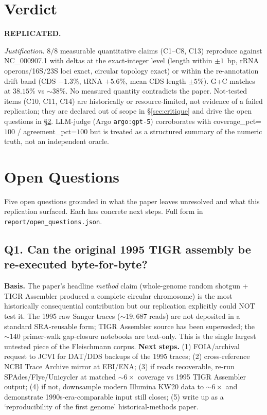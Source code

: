 \documentclass[10pt]{article}
\begin{document}
\section{Verdict}
\label{sec:verdict}

\textbf{REPLICATED.}

\noindent\emph{Justification.} $8/8$ measurable quantitative claims (C1--C8, C13) reproduce
against NC\_000907.1 with deltas at the exact-integer level (length within $\pm 1$~bp, rRNA
operons/16S/23S loci exact, circular topology exact) or within the re-annotation drift band
(CDS $-1.3\%$, tRNA $+5.6\%$, mean CDS length $\pm 5\%$). G+C matches at $38.15\%$ vs
$\sim 38\%$. No measured quantity contradicts the paper. Not-tested items (C10, C11, C14)
are historically or resource-limited, not evidence of a failed replication; they are
declared out of scope in \S\ref{sec:critique} and drive the open questions in
\S\ref{sec:open}. LLM-judge (Argo \texttt{argo:gpt-5}) corroborates with
coverage\_pct=$100$ / agreement\_pct=$100$ but is treated as a structured summary of the
numeric truth, not an independent oracle.

\section{Open Questions}
\label{sec:open}

Five open questions grounded in what the paper leaves unresolved and what this replication
surfaced. Each has concrete next steps. Full form in \texttt{report/open\_questions.json}.

\subsection*{Q1. Can the original 1995 TIGR assembly be re-executed byte-for-byte?}
\textbf{Basis.} The paper's headline \emph{method} claim (whole-genome random shotgun +
TIGR Assembler produced a complete circular chromosome) is the most historically consequential
contribution but our replication explicitly could NOT test it. The 1995 raw Sanger traces
($\sim 19{,}687$ reads) are not deposited in a standard SRA-reusable form; TIGR Assembler
source has been superseded; the $\sim 140$ primer-walk gap-closure notebooks are text-only.
This is the single largest untested piece of the Fleischmann corpus.
\textbf{Next steps.} (1) FOIA/archival request to JCVI for DAT/DDS backups of the 1995 traces;
(2) cross-reference NCBI Trace Archive mirror at EBI/ENA; (3) if reads recoverable, re-run
SPAdes/Flye/Unicycler at matched $\sim 6\times$ coverage vs 1995 TIGR Assembler output;
(4) if not, downsample modern Illumina KW20 data to $\sim 6\times$ and demonstrate
1990s-era-comparable input still closes; (5) write up as a `reproducibility of the first
genome' historical-methods paper.
\end{document}

